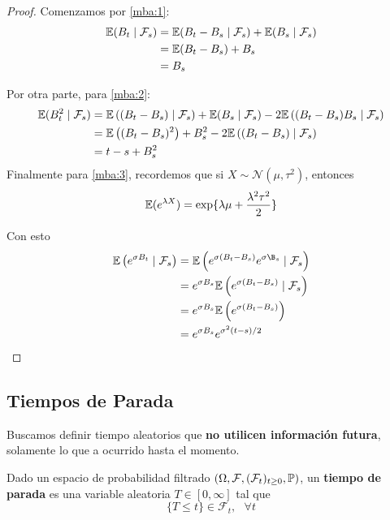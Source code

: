 \begin{proof}
\gris
Comenzamos por \ref{mba:1}: 
\begin{align*}
    \E(B_t \mid \mathcal{F}_s ) &= \E (B_t - B_s \mid \mathcal{F}_s)
        + \E(B_s \mid \mathcal{F}_s) \\
        &= \E(B_t - B_s) + B_s \\ 
        &= B_s 
\end{align*}

Por otra parte, para \ref{mba:2}: 
\begin{align*}
\E(B_t^2 \mid \mathcal{F}_s) 
&=  \E \left( (B_{t} - B_{s}) \mid \mathcal{F}_s \right) + \E(B_s \mid
\mathcal{F}_s) - 2 \E \left( (B_t - B_s)B_s \mid \mathcal{F}_s \right) \\ 
&= \E\left( (B_t - B_s)^2 \right) + B_s^2 -2 \E \left((B_t - B_s) \mid \mathcal{F}_s\right)\\
&= t - s + B_s^2
\end{align*}
Finalmente para \ref{mba:3}, recordemos que si $X \sim \mathcal{N}(\mu, \tau^2)$, entonces 
\begin{equation*}
        \E (e^{\lambda X}) = \exp\{\lambda \mu + \frac{\lambda^2 \tau^2}{2}\}
\end{equation*}

Con esto 
\begin{align*}
        \E \left( e^{\sigma B_t} \mid \mathcal{F}_s \right) 
        &= \E \left( e^{\sigma (B_t - B_s)} e^{\sigma \B_s} \mid \mathcal{F}_s\right) \\
        &= e^{\sigma B_s} \E \left(e^{\sigma(B_t - B_s)} \mid \mathcal{F}_s\right) \\ 
        &= e^{\sigma B_s} \E \left( e^{\sigma(B_t - B_s)} \right) \\ 
        &= e^{\sigma B_s} e^{\sigma^2(t-s)/2}
\end{align*}
\findem
\negro
\end{proof}

\subsection{Tiempos de Parada}

Buscamos definir tiempo aleatorios que \textbf{no utilicen información futura},
solamente lo que a ocurrido hasta el momento. 

\begin{definition}
       Dado un espacio de probabilidad filtrado $(\Omega, \mathcal{F}, (\mathcal{F}_t)_{t \geq 0}, \P)$, 
        un \textbf{tiempo de parada} es una variable aleatoria $T \in [0, \infty]$ tal que 
        \begin{equation*}
                \{ T \leq t \} \in \mathcal{F}_t, ~ ~ ~ \forall  t
        \end{equation*}
\end{definition}

